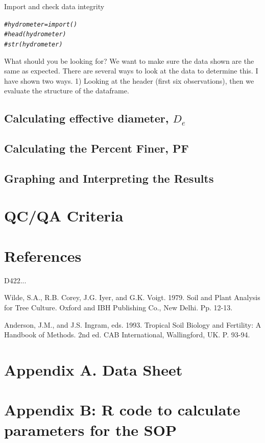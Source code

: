 \documentclass[12pt]{../SOP4_alpha}\usepackage[]{graphicx}\usepackage[]{xcolor}
\makeatletter
\newcommand{\hlcom}[1]{\textcolor[rgb]{0.678,0.584,0.686}{\textit{#1}}}%
\newenvironment{kframe}{%
 \def\at@end@of@kframe{}%
 \ifinner\ifhmode%
  \def\at@end@of@kframe{\end{minipage}}%
  \begin{minipage}{\columnwidth}%
 \fi\fi%
 \def\FrameCommand##1{\hskip\@totalleftmargin \hskip-\fboxsep
 \colorbox{shadecolor}{##1}\hskip-\fboxsep
     \hskip-\linewidth \hskip-\@totalleftmargin \hskip\columnwidth}%
 \MakeFramed {\advance\hsize-\width
   \@totalleftmargin\z@ \linewidth\hsize
   \@setminipage}}%
 {\par\unskip\endMakeFramed%
 \at@end@of@kframe}
\newenvironment{knitrout}{}{} %
\makeatother
\begin{document}
Import and check data integrity

\begin{knitrout}
\color{fgcolor}\begin{kframe}
\begin{alltt}
\hlcom{#hydrometer = import()}
\hlcom{#head(hydrometer)}
\hlcom{#str(hydrometer)}
\end{alltt}
\end{kframe}
\end{knitrout}

What should you be looking for?  We want to make sure the data shown are the same as expected. There are several ways to look at the data to determine this. I have shown two ways. 1) Looking at the header (first six observations), then we evaluate the structure of the dataframe.
 
\subsection{Calculating effective diameter, $D_e$}


\subsection{Calculating the Percent Finer, PF}


\subsection{Graphing and Interpreting the Results}

\section{QC/QA Criteria}

\section{References}

\NP D422...

\NP Wilde, S.A., R.B. Corey, J.G. Iyer, and G.K. Voigt.  1979.  Soil and Plant Analysis for Tree Culture.  Oxford and IBH Publishing Co., New Delhi.  Pp. 12-13.

\NP Anderson, J.M., and J.S. Ingram, eds.  1993.  Tropical Soil Biology and Fertility:  A Handbook of Methods. 2nd ed.  CAB International, Wallingford, UK.  P. 93-94.

\section{Appendix A. Data Sheet}




\newpage
\section{Appendix B: R code to calculate parameters for the SOP}

% 	
\end{document}
